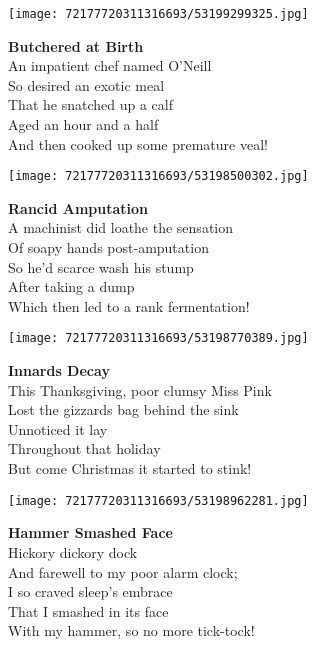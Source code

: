 \documentclass[10pt,letterpaper]{article}
\begin{document}
\begin{center}\texttt{[image: 72177720311316693/53199299325.jpg]}
\end{center}
\begin{center}
\textbf{Butchered at Birth}\\
\vskip 0.2in
An impatient chef named O'Neill\\
So desired an exotic meal\\
That he snatched up a calf\\
Aged an hour and a half\\
And then cooked up some premature veal!\\
\end{center}
\pagebreak

\begin{center}\texttt{[image: 72177720311316693/53198500302.jpg]}
\end{center}
\begin{center}
\textbf{Rancid Amputation}\\
\vskip 0.2in
A machinist did loathe the sensation\\
Of soapy hands post-amputation\\
So he'd scarce wash his stump\\
After taking a dump\\
Which then led to a rank fermentation!\\
\end{center}
\pagebreak

\begin{center}\texttt{[image: 72177720311316693/53198770389.jpg]}
\end{center}
\begin{center}
\textbf{Innards Decay}\\
\vskip 0.2in
This Thanksgiving, poor clumsy Miss Pink\\
Lost the gizzards bag behind the sink\\
Unnoticed it lay\\
Throughout that holiday\\
But come Christmas it started to stink!\\
\end{center}
\pagebreak

\begin{center}\texttt{[image: 72177720311316693/53198962281.jpg]}
\end{center}
\begin{center}
\textbf{Hammer Smashed Face}\\
\vskip 0.2in
Hickory dickory dock\\
And farewell to my poor alarm clock;\\
I so craved sleep's embrace\\
That I smashed in its face\\
With my hammer, so no more tick-tock!\\
\end{center}
\pagebreak
\end{document}
